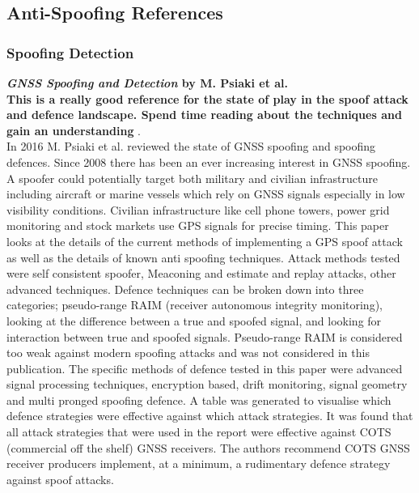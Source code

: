 \medskip

\subsection{Anti-Spoofing References}
\subsubsection{Spoofing Detection}

\textbf{\emph{GNSS Spoofing and Detection} by M. Psiaki et al.} \\
\textbf{This is a really good reference for the state of play in the spoof attack and defence landscape. Spend time reading about the techniques and 
gain an understanding} .\\
In 2016 M. Psiaki et al. \cite{RN12} reviewed the state of GNSS spoofing and spoofing defences. Since 2008 there has been an ever increasing 
interest in GNSS spoofing. A spoofer could potentially target both military and civilian infrastructure including aircraft or marine vessels which
rely on GNSS signals especially in low visibility conditions. Civilian infrastructure like cell phone towers, power grid monitoring and stock markets
use GPS signals for precise timing. This paper looks at the details of the current methods of implementing a GPS spoof attack as well as the details
of known anti spoofing techniques. Attack methods tested were self consistent spoofer, Meaconing and estimate and replay attacks, other advanced techniques.
Defence techniques can be broken down into three categories; pseudo-range RAIM (receiver autonomous integrity monitoring),
looking at the difference between a true and spoofed signal, and looking for interaction between true and spoofed signals. Pseudo-range RAIM is considered
too weak against modern spoofing attacks and was not considered in this publication. The specific methods of defence tested in this paper  
were advanced signal processing techniques, encryption based, drift monitoring, signal geometry and multi pronged spoofing defence.
A table was generated to visualise which defence strategies were effective against which attack strategies. 
It was found that all attack strategies that were used in the report were effective against COTS (commercial off the shelf) GNSS receivers. The authors
recommend COTS GNSS receiver producers implement, at a minimum, a rudimentary defence strategy against spoof attacks. 

